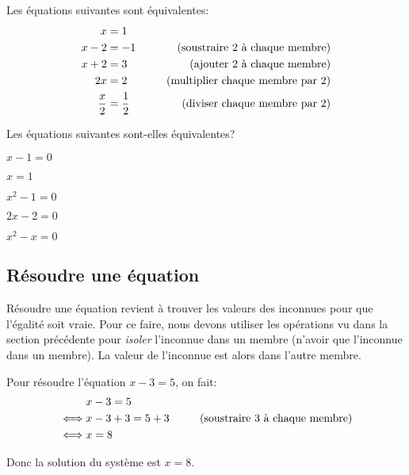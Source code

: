 \begin{exemple}
    Les équations suivantes sont équivalentes:
    \begin{alignat*}{3}
        x & = 1 &\\
        x - 2 & = -1& \text{  (soustraire 2 à chaque membre)}\\
        x + 2 & = 3& \text{ (ajouter 2 à chaque membre)}\\
        2x & = 2& \hspace{5mm}\text{ (multiplier chaque membre par 2)}\\
        \frac{x}2 & = \frac12& \text{ (diviser chaque membre par 2)}\\
    \end{alignat*}
\end{exemple}

\begin{exercicefr}
    Les équations suivantes sont-elles équivalentes?
    \begin{exerciceenumnoeq}
        \item $x - 1 = 0$
        \item $x = 1$
        \item $x^2 - 1 = 0$
        \item $2x - 2 = 0$
        \item $x^2 - x = 0$
    \end{exerciceenumnoeq}
\end{exercicefr}


\subsection{Résoudre une équation}

Résoudre une équation revient à trouver les valeurs des inconnues pour que l'égalité soit vraie. Pour ce faire, nous devons utiliser les opérations vu dans la section précédente pour \emph{isoler} l'inconnue dans un membre (n'avoir que l'inconnue dans un membre). La valeur de l'inconnue est alors dans l'autre membre.

\begin{exemple}
    Pour résoudre l'équation $x - 3 = 5$, on fait:
    \begin{alignat*}{3}
        & x - 3 = 5&\\
        \iff & x - 3 + 3 = 5 + 3 & \hspace{5mm} \text{ (soustraire 3 à chaque membre)}\\
        \iff & x = 8 &
    \end{alignat*}

    Donc la solution du système est $x = 8$.
\end{exemple}

